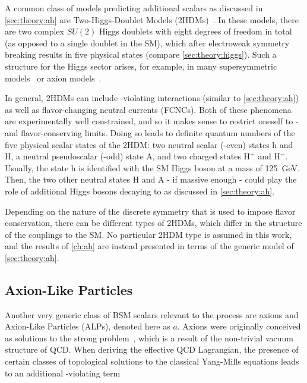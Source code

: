 A common class of models predicting additional scalars as discussed in \cref{sec:theory:ah} are Two-Higgs-Doublet Models (2HDMs)~\cite{Lee:1973iz,Branco:2011iw}. In these models, there are two complex $SU(2)$ Higgs doublets with eight degrees of freedom in total (as opposed to a single doublet in the SM), which after electroweak symmetry breaking results in five physical states (compare \cref{sec:theory:higgs}). Such a structure for the Higgs sector arises, for example, in many supersymmetric models~\cite{Haber:1984rc} or axion models~\cite{Kim:1986ax}.

In general, 2HDMs can include \CP-violating interactions (similar to \cref{sec:theory:ah}) as well as flavor-changing neutral currents (FCNCs). Both of these phenomena are experimentally well constrained, and so it makes sense to restrict oneself to \CP- and flavor-conserving limits. Doing so leads to definite quantum numbers of the five physical scalar states of the 2HDM: two neutral scalar (\CP-even) states h and H, a neutral pseudoscalar (\CP-odd) state A, and two charged states $\mathrm{H}^+$ and $\mathrm{H}^-$. Usually, the state h is identified with the SM Higgs boson at a mass of \SI{125}{\GeV}. Then, the two other neutral states H and A - if massive enough - could play the role of additional Higgs bosons decaying to \ttbar as discussed in \cref{sec:theory:ah}.

Depending on the nature of the discrete symmetry that is used to impose flavor conservation, there can be different types of 2HDMs, which differ in the structure of the couplings to the SM. No particular 2HDM type is assumed in this work, and the results of \cref{ch:ah} are instead presented in terms of the generic model of \cref{sec:theory:ah}.

\subsection{Axion-Like Particles}
\label{sec:theory:alps}

Another very generic class of BSM scalars relevant to the \pptt process are axions and Axion-Like Particles (ALPs), denoted here as $a$. 
Axions were originally conceived as solutions to the strong \CP problem~\cite{Peccei:1977hh,Peccei:1977ur,Weinberg:1977ma,Wilczek:1977pj}, which is a result of the non-trivial vacuum structure of QCD. When deriving the effective QCD Lagrangian, the presence of certain classes of topological solutions to the classical Yang-Mills equations leads to an additional \CP-violating term~\cite{DiLuzio:2020wdo}

